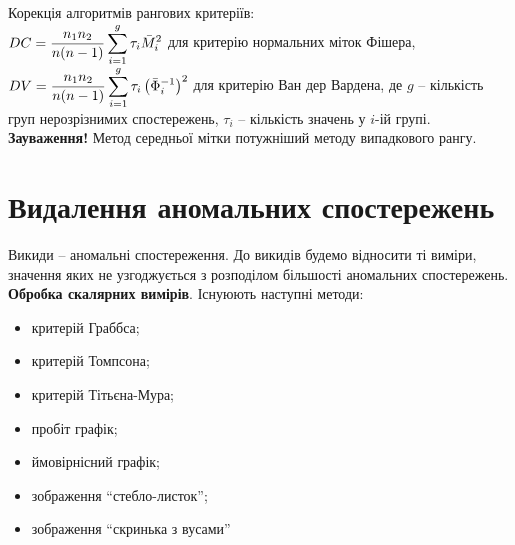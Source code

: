 Корекція алгоритмів рангових критеріїв: \\

$DC = \dfrac{n_1 n_2}{n(n-1)} \displaystyle\sum\limits_{i=1}^g \tau_i \bar{M}_i^2$ для критерію нормальних міток Фішера, $DV = \dfrac{n_1 n_2}{n(n-1)} \displaystyle\sum\limits_{i=1}^g \tau_i \left( \bar{\Phi}_i^{-1} \right)^2$ для критерію Ван дер Вардена, де $g$ -- кількість груп нерозрізнимих спостережень, $\tau_i$ -- кількість значень у $i$-ій групі. \\

\textbf{Зауваження!} Метод середньої мітки потужніший методу випадкового рангу.

\section{Видалення аномальних спостережень}

Викиди -- аномальні спостереження. До викидів будемо відносити ті виміри, значення яких не узгоджується  з розподілом більшості аномальних спостережень. \\

\textbf{Обробка скалярних вимірів}. Існуюють наступні методи:
\begin{itemize}
    \item критерій Граббса;
    
    \item критерій Томпсона;
    
    \item критерій Тітьєна-Мура;
    
    \item пробіт графік;
    
    \item ймовірнісний графік;
    
    \item зображення ``стебло-листок'';
    
    \item зображення ``скринька з вусами''
\end{itemize}


